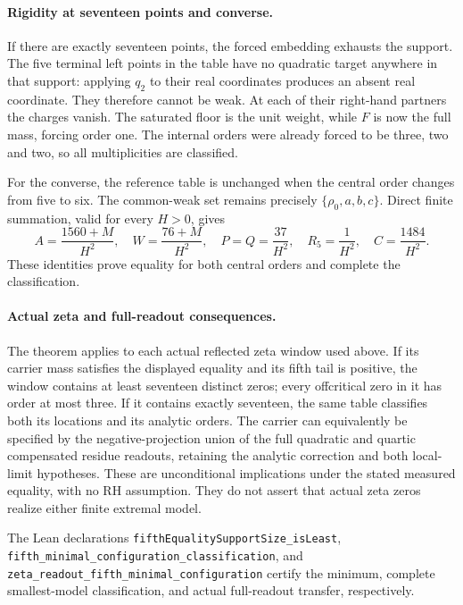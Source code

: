 \paragraph{Rigidity at seventeen points and converse.}
If there are exactly seventeen points, the forced embedding exhausts
the support. The five terminal left points in the table have no
quadratic target anywhere in that support: applying \(q_2\) to their
real coordinates produces an absent real coordinate. They therefore
cannot be weak. At each of their right-hand partners the charges
vanish. The saturated floor is the unit weight, while \(F\) is now
the full mass, forcing order one. The internal orders were already
forced to be three, two and two, so all multiplicities are classified.

For the converse, the reference table is unchanged when the central
order changes from five to six. The common-weak set remains precisely
\(\{\rho_0,a,b,c\}\). Direct finite summation, valid for every \(H>0\),
gives
\[
 A=\frac{1560+M}{H^2},\quad
 W=\frac{76+M}{H^2},\quad
 P=Q=\frac{37}{H^2},\quad R_5=\frac1{H^2},\quad
 C=\frac{1484}{H^2}.
\]
These identities prove equality for both central orders and complete
the classification.

\paragraph{Actual zeta and full-readout consequences.}
The theorem applies to each actual reflected zeta window used above.
If its carrier mass satisfies the displayed equality and its fifth
tail is positive, the window contains at least seventeen distinct
zeros; every offcritical zero in it has order at most three.
If it contains exactly seventeen, the same table classifies both its
locations and its analytic orders. The carrier can equivalently be
specified by the negative-projection union of the full quadratic and
quartic compensated residue readouts, retaining the analytic correction
and both local-limit hypotheses. These are unconditional implications
under the stated measured equality, with no RH assumption. They do not
assert that actual zeta zeros realize either finite extremal model.

The Lean declarations
\texttt{fifthEqualitySupportSize\_isLeast},
\texttt{fifth\_minimal\_configuration\_classification},
and \texttt{zeta\_readout\_fifth\_minimal\_configuration} certify the
minimum, complete smallest-model classification, and actual full-readout
transfer, respectively.

